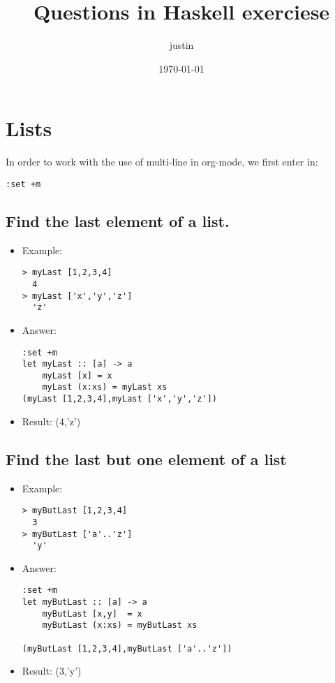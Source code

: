 \documentclass[11pt]{article}
\title{Questions in Haskell exerciese}
\author{justin}
\date{\today}
\begin{document}
\maketitle

\setcounter{tocdepth}{3}
\tableofcontents
\vspace*{1cm}

\section{Lists}
\label{sec-1}

In order to work with the use of multi-line in org-mode,
we first enter in: 

\begin{verbatim}
:set +m
\end{verbatim}
\subsection{Find the last element of a list.}
\label{sec-1-1}

\begin{itemize}
\item Example:

\begin{verbatim}
> myLast [1,2,3,4]
  4
> myLast ['x','y','z']
  'z'
\end{verbatim}
\end{itemize}


\begin{itemize}
\item Answer:

\begin{verbatim}
:set +m
let myLast :: [a] -> a
    myLast [x] = x
    myLast (x:xs) = myLast xs
(myLast [1,2,3,4],myLast ['x','y','z'])
\end{verbatim}
\item Result: (4,'z')
\end{itemize}
  
\subsection{Find the last but one element of a list}
\label{sec-1-2}

\begin{itemize}
\item Example:

\begin{verbatim}
> myButLast [1,2,3,4]
  3
> myButLast ['a'..'z']
  'y'
\end{verbatim}
\item Answer:

\begin{verbatim}
:set +m
let myButLast :: [a] -> a
    myButLast [x,y]  = x
    myButLast (x:xs) = myButLast xs

(myButLast [1,2,3,4],myButLast ['a'..'z'])
\end{verbatim}
\item Result: (3,'y')
\end{itemize}
\end{document}
